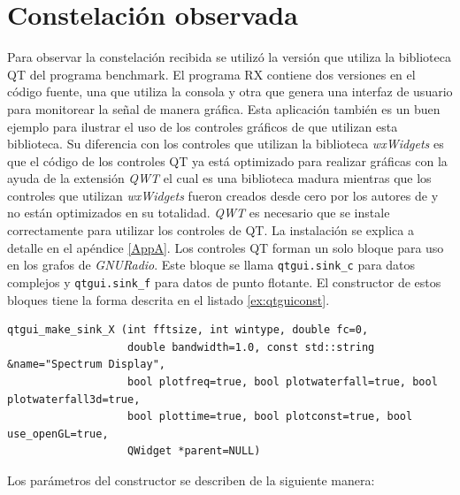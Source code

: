 \section{Constelaci\'on observada}

Para observar la constelaci\'on recibida se utiliz\'o la versi\'on que utiliza la biblioteca QT
del programa benchmark. El programa RX contiene dos versiones en el c\'odigo fuente, una que utiliza
la consola y otra que genera una interfaz de usuario para monitorear la se\~nal de manera gr\'afica.
Esta aplicaci\'on tambi\'en es un buen ejemplo para ilustrar el uso de los controles gr\'aficos de
\gnuradio que utilizan esta biblioteca. Su diferencia con los controles que utilizan la biblioteca
\emph{wxWidgets} es que el c\'odigo de los controles QT ya est\'a optimizado para realizar gr\'aficas
con la ayuda de la extensi\'on \emph{QWT} el cual es una biblioteca madura mientras que los
controles que utilizan \emph{wxWidgets} fueron creados desde cero por los autores de \gnuradio y no
est\'an optimizados en su totalidad. \emph{QWT} es necesario que se instale correctamente para
utilizar los controles de QT. La instalaci\'on se explica a detalle en el ap\'endice \ref{AppA}. Los
controles QT forman un solo bloque para uso en los grafos de \emph{GNURadio}. Este bloque se llama
\verb|qtgui.sink_c| para datos complejos y \verb|qtgui.sink_f| para datos de punto flotante. El
constructor de estos bloques tiene la forma descrita en el listado \ref{ex:qtguiconst}.

\begin{lstlisting}[float, label=ex:qtguiconst, caption={Constructor de los bloques qtgui\_sink\_x},
breaklines=true, language={[ISO]C++}]
qtgui_make_sink_X (int fftsize, int wintype, double fc=0, 
                   double bandwidth=1.0, const std::string &name="Spectrum Display",
                   bool plotfreq=true, bool plotwaterfall=true, bool plotwaterfall3d=true,
                   bool plottime=true, bool plotconst=true, bool use_openGL=true,
                   QWidget *parent=NULL)
\end{lstlisting}

Los par\'ametros del constructor se describen de la siguiente manera:

